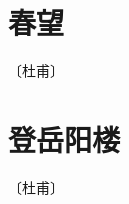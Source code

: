 \documentclass[12pt,UTF-8,openany]{ctexbook}
\begin{document}
\vspace{8pt}


\section{春望}

\begin{center}
    \vspace{10pt}
    
    \begin{normalsize}
        
        〔杜甫〕
        
    \end{normalsize}
    
    \vspace{8pt}
    
    \begin{large}
        
        
        
        
        
    \end{large}
    
\end{center}

\vspace{8pt}


\section{登岳阳楼}

\begin{center}
    \vspace{10pt}
    
    \begin{normalsize}
        
        〔杜甫〕
        
    \end{normalsize}
    
    \vspace{8pt}
    
    \begin{large}
        
        
        
        
        
    \end{large}
    
\end{center}
\end{document}
